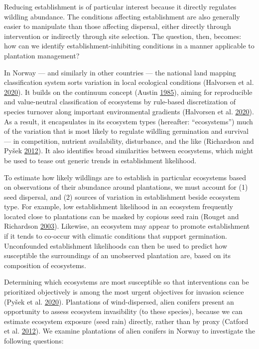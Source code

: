 \documentclass[
]{article}
\begin{document}
Reducing establishment is of particular interest because it directly regulates wildling abundance.
The conditions affecting establishment are also generally easier to manipulate than those affecting dispersal, either directly through intervention or indirectly through site selection.
The question, then, becomes: how can we identify establishment-inhibiting conditions in a manner applicable to plantation management?

In Norway --- and similarly in other countries --- the national land mapping classification system sorts variation in local ecological conditions (Halvorsen et al. \protect\hyperlink{ref-halvorsenSystematicsEcodiversityEcoSyst2020}{2020}).
It builds on the continuum concept (Austin \protect\hyperlink{ref-austinContinuumConceptOrdination1985}{1985}), aiming for reproducible and value-neutral classification of ecosystems by rule-based discretization of species turnover along important environmental gradients (Halvorsen et al. \protect\hyperlink{ref-halvorsenSystematicsEcodiversityEcoSyst2020}{2020}).
As a result, it encapsulates in its ecosystem types (hereafter: ``ecosystems'') much of the variation that is most likely to regulate wildling germination and survival --- in competition, nutrient availability, disturbance, and the like (Richardson and Pyšek \protect\hyperlink{ref-richardsonNaturalizationIntroducedPlants2012}{2012}).
It also identifies broad similarities between ecosystems, which might be used to tease out generic trends in establishment likelihood.

To estimate how likely wildlings are to establish in particular ecosystems based on observations of their abundance around plantations, we must account for (1) seed dispersal, and (2) sources of variation in establishment beside ecosystem type.
For example, low establishment likelihood in an ecosystem frequently located close to plantations can be masked by copious seed rain (Rouget and Richardson \protect\hyperlink{ref-rougetInferringProcessPattern2003}{2003}).
Likewise, an ecosystem may appear to promote establishment if it tends to co-occur with climatic conditions that support germination.
Unconfounded establishment likelihoods can then be used to predict how susceptible the surroundings of an unobserved plantation are, based on its composition of ecosystems.

Determining which ecosystems are most susceptible so that interventions can be prioritized objectively is among the most urgent objectives for invasion science (Pyšek et al. \protect\hyperlink{ref-pysekScientistsWarningInvasive2020}{2020}).
Plantations of wind-dispersed, alien conifers present an opportunity to assess ecosystem invasibility (to these species), because we can estimate ecosystem exposure (seed rain) directly, rather than by proxy (Catford et al. \protect\hyperlink{ref-catfordQuantifyingLevelsBiological2012}{2012}).
We examine plantations of alien conifers in Norway to investigate the following questions:
\end{document}
